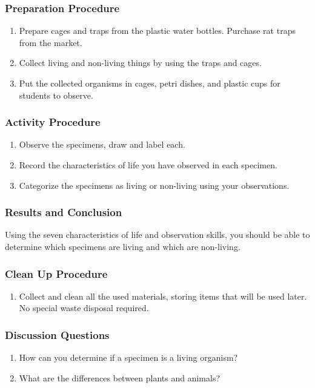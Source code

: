 \subsubsection*{Preparation Procedure}
\begin{enumerate}
\item{Prepare cages and traps from the plastic water bottles. Purchase rat traps from the market.}
\item{Collect living and non-living things by using the traps and cages.}
\item{Put the collected organisms in cages, petri dishes, and plastic cups for students to observe.}
\end{enumerate}

\subsubsection*{Activity Procedure}
\begin{enumerate}
\item{Observe the specimens, draw and label each.}
\item{Record the characteristics of life you have observed in each specimen.}
\item{Categorize the specimens as living or non-living using your observations.}
\end{enumerate}

\subsubsection*{Results and Conclusion}
Using the seven characteristics of life and observation skills, you should be able to determine which specimens are living and which are non-living. 

\subsubsection*{Clean Up Procedure}
\begin{enumerate}
\item{Collect and clean all the used materials, storing items that will be used later. No special waste disposal required.}
\end{enumerate}

\subsubsection*{Discussion Questions}
\begin{enumerate}
\item{How can you determine if a specimen is a living organism?}
\item{What are the differences between plants and animals?}
\end{enumerate}


